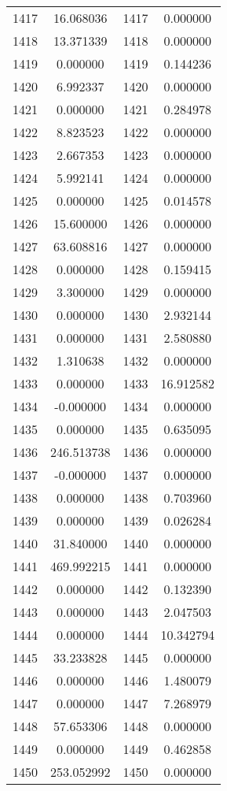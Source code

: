 \documentclass[12pt]{article}
\begin{document}
\begin{longtable}{@{}cccc@{}}
1417 & 16.068036 & 1417 & 0.000000 \\
1418 & 13.371339 & 1418 & 0.000000 \\
1419 & 0.000000 & 1419 & 0.144236 \\
1420 & 6.992337 & 1420 & 0.000000 \\
1421 & 0.000000 & 1421 & 0.284978 \\
1422 & 8.823523 & 1422 & 0.000000 \\
1423 & 2.667353 & 1423 & 0.000000 \\
1424 & 5.992141 & 1424 & 0.000000 \\
1425 & 0.000000 & 1425 & 0.014578 \\
1426 & 15.600000 & 1426 & 0.000000 \\
1427 & 63.608816 & 1427 & 0.000000 \\
1428 & 0.000000 & 1428 & 0.159415 \\
1429 & 3.300000 & 1429 & 0.000000 \\
1430 & 0.000000 & 1430 & 2.932144 \\
1431 & 0.000000 & 1431 & 2.580880 \\
1432 & 1.310638 & 1432 & 0.000000 \\
1433 & 0.000000 & 1433 & 16.912582 \\
1434 & -0.000000 & 1434 & 0.000000 \\
1435 & 0.000000 & 1435 & 0.635095 \\
1436 & 246.513738 & 1436 & 0.000000 \\
1437 & -0.000000 & 1437 & 0.000000 \\
1438 & 0.000000 & 1438 & 0.703960 \\
1439 & 0.000000 & 1439 & 0.026284 \\
1440 & 31.840000 & 1440 & 0.000000 \\
1441 & 469.992215 & 1441 & 0.000000 \\
1442 & 0.000000 & 1442 & 0.132390 \\
1443 & 0.000000 & 1443 & 2.047503 \\
1444 & 0.000000 & 1444 & 10.342794 \\
1445 & 33.233828 & 1445 & 0.000000 \\
1446 & 0.000000 & 1446 & 1.480079 \\
1447 & 0.000000 & 1447 & 7.268979 \\
1448 & 57.653306 & 1448 & 0.000000 \\
1449 & 0.000000 & 1449 & 0.462858 \\
1450 & 253.052992 & 1450 & 0.000000 \\

\end{longtable}
\end{document}
